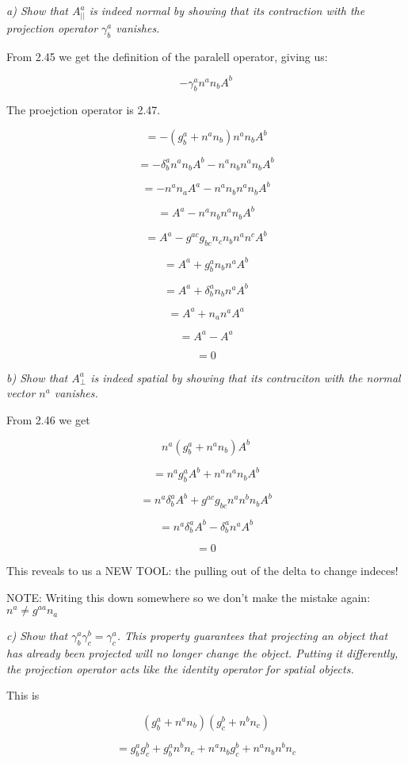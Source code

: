 \documentclass[landscape,letterpaper,10pt,english]{article}
\begin{document}
\[\label{P5}\]

\emph{a) Show that \(A^a_{||}\) is indeed normal by showing that its
contraction with the projection operator \(\gamma^a_b\) vanishes.}

    From 2.45 we get the definition of the paralell operator, giving us:

\[ - \gamma^a_b n^a n_b A^b \]

The proejction operator is 2.47.

\[ = - (g^a_b + n^an_b) n^a n_b A^b \]

\[ = -\delta^a_bn^a n_b A^b -n^an_b n^a n_b A^b \]

    \[ = - n^a n_a A^a - n^an_b n^a n_b A^b \]

\[ = A^a - n^an_b n^a n_b A^b \]

\[ = A^a - g^{ac}g_{bc}n_cn_b n^a n^c A^b \]

\[ = A^a + g^a_bn_b n^a A^b \]

\[ = A^a + \delta^a_bn_b n^a A^b \]

\[ = A^a + n_a n^a A^a \]

\[ = A^a - A^a \]

\[ = 0 \]

    \emph{b) Show that \(A^a_\perp\) is indeed spatial by showing that its
contraciton with the normal vector \(n^a\) vanishes.}

From 2.46 we get

\[ n^a(g^a_b + n^an_b)A^b \]

\[ = n^ag^a_bA^b + n^an^an_bA^b \]

\[ = n^a\delta^a_bA^b + g^{ac}g_{bc}n^an^bn_bA^b \]

\[ = n^a\delta^a_bA^b - \delta^a_bn^aA^b \]

\[ = 0 \]

This reveals to us a NEW TOOL: the pulling out of the delta to change
indeces!

NOTE: Writing this down somewhere so we don't make the mistake again:
\(n^a \neq g^{aa}n_a\)

    \emph{c) Show that \(\gamma^a_b\gamma^b_c=\gamma^a_c\). This property
guarantees that projecting an object that has already been projected
will no longer change the object. Putting it differently, the projection
operator acts like the identity operator for spatial objects.}

This is

\[ (g^a_b + n^an_b)(g^b_c + n^bn_c) \]

\[ = g^a_bg^b_c +g^a_bn^bn_c + n^an_bg^b_c + n^an_bn^bn_c \]
\end{document}
